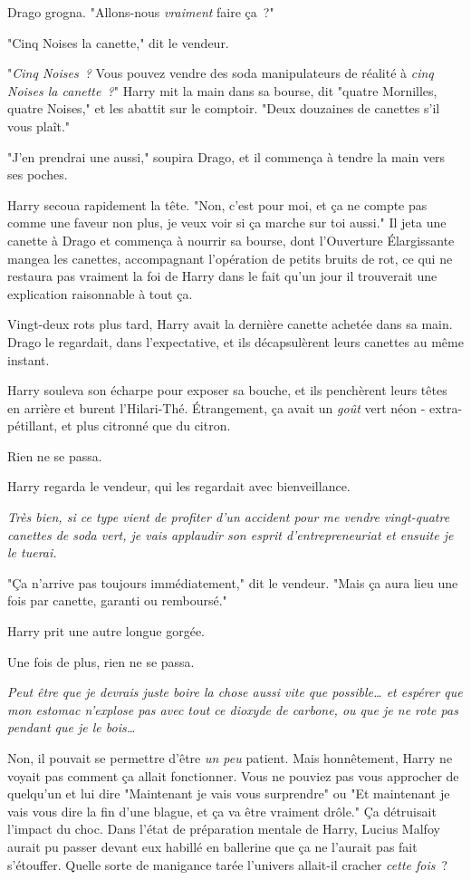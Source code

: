 Drago grogna. "Allons-nous \emph{vraiment} faire ça~?"

"Cinq Noises la canette," dit le vendeur.

"\emph{Cinq Noises~?} Vous pouvez vendre des soda manipulateurs de réalité à \emph{cinq Noises la canette~?}" Harry mit la main dans sa bourse, dit "quatre Mornilles, quatre Noises," et les abattit sur le comptoir. "Deux douzaines de canettes s'il vous plaît."

"J'en prendrai une aussi," soupira Drago, et il commença à tendre la main vers ses poches.

Harry secoua rapidement la tête. "Non, c'est pour moi, et ça ne compte pas comme une faveur non plus, je veux voir si ça marche sur toi aussi." Il jeta une canette à Drago et commença à nourrir sa bourse, dont l'Ouverture Élargissante mangea les canettes, accompagnant l'opération de petits bruits de rot, ce qui ne restaura pas vraiment la foi de Harry dans le fait qu'un jour il trouverait une explication raisonnable à tout ça.

Vingt-deux rots plus tard, Harry avait la dernière canette achetée dans sa main. Drago le regardait, dans l'expectative, et ils décapsulèrent leurs canettes au même instant.

Harry souleva son écharpe pour exposer sa bouche, et ils penchèrent leurs têtes en arrière et burent l'Hilari-Thé. Étrangement, ça avait un \emph{goût} vert néon - extra-pétillant, et plus citronné que du citron.

Rien ne se passa.

Harry regarda le vendeur, qui les regardait avec bienveillance.

\emph{Très bien, si ce type vient de profiter d'un accident pour me vendre vingt-quatre canettes de soda vert, je vais applaudir son esprit d'entrepreneuriat et ensuite je le tuerai.}

"Ça n'arrive pas toujours immédiatement," dit le vendeur. "Mais ça aura lieu une fois par canette, garanti ou remboursé."

Harry prit une autre longue gorgée.

Une fois de plus, rien ne se passa.

\emph{Peut être que je devrais juste boire la chose aussi vite que possible… et espérer que mon estomac n'explose pas avec tout ce dioxyde de carbone, ou que je ne rote pas pendant que je le bois…}

Non, il pouvait se permettre d'être \emph{un peu} patient. Mais honnêtement, Harry ne voyait pas comment ça allait fonctionner. Vous ne pouviez pas vous approcher de quelqu'un et lui dire "Maintenant je vais vous surprendre" ou "Et maintenant je vais vous dire la fin d'une blague, et ça va être vraiment drôle." Ça détruisait l'impact du choc. Dans l'état de préparation mentale de Harry, Lucius Malfoy aurait pu passer devant eux habillé en ballerine que ça ne l'aurait pas fait s'étouffer. Quelle sorte de manigance tarée l'univers allait-il cracher \emph{cette fois}~?

